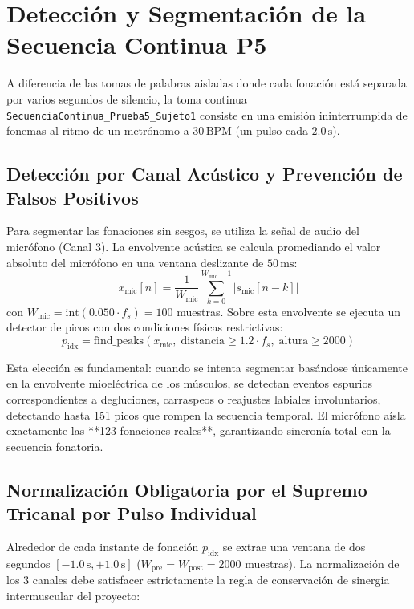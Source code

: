 \documentclass[11pt,a4paper,openany]{book}
\theoremstyle{definition}
\begin{document}
\section{Detección y Segmentación de la Secuencia Continua P5}
\label{sec:secuencia_continua}

A diferencia de las tomas de palabras aisladas donde cada fonación está separada por varios segundos de silencio, la toma continua \texttt{SecuenciaContinua\_Prueba5\_Sujeto1} consiste en una emisión ininterrumpida de fonemas al ritmo de un metrónomo a $30\,\text{BPM}$ (un pulso cada $2.0\,\text{s}$).

\subsection{Detección por Canal Acústico y Prevención de Falsos Positivos}
\label{subsec:deteccion_acustica}

Para segmentar las fonaciones sin sesgos, se utiliza la señal de audio del micrófono (Canal 3). La envolvente acústica se calcula promediando el valor absoluto del micrófono en una ventana deslizante de $50\,\text{ms}$:
\begin{equation}
    x_{\text{mic}}[n] = \frac{1}{W_{\text{mic}}} \sum_{k=0}^{W_{\text{mic}}-1} |s_{\text{mic}}[n - k]|
\end{equation}
con $W_{\text{mic}} = \text{int}(0.050 \cdot f_s) = 100$ muestras. Sobre esta envolvente se ejecuta un detector de picos con dos condiciones físicas restrictivas:
\begin{equation}
    p_{\text{idx}} = \text{find\_peaks}(x_{\text{mic}}, \; \text{distancia} \ge 1.2 \cdot f_s, \; \text{altura} \ge 2000)
\end{equation}

Esta elección es fundamental: cuando se intenta segmentar basándose únicamente en la envolvente mioeléctrica de los músculos, se detectan eventos espurios correspondientes a degluciones, carraspeos o reajustes labiales involuntarios, detectando hasta 151 picos que rompen la secuencia temporal. El micrófono aísla exactamente las **123 fonaciones reales**, garantizando sincronía total con la secuencia fonatoria.

\subsection{Normalización Obligatoria por el Supremo Tricanal por Pulso Individual}
\label{subsec:supremo_tricanal}

Alrededor de cada instante de fonación $p_{\text{idx}}$ se extrae una ventana de dos segundos $[-1.0\,\text{s}, +1.0\,\text{s}]$ ($W_{\text{pre}} = W_{\text{post}} = 2000$ muestras). La normalización de los 3 canales debe satisfacer estrictamente la regla de conservación de sinergia intermuscular del proyecto:
\end{document}
